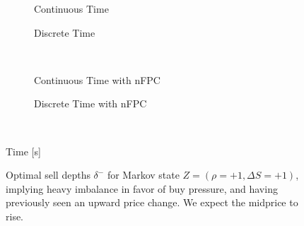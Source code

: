 \begin{figure}%
\centering%
\begin{subfigure}[b]{.4\linewidth}%
  \setlength\figureheight{\linewidth}%
  \setlength\figurewidth{\linewidth}%
  \caption{Continuous Time}%
\end{subfigure}%
\hspace{1.5cm}%
\begin{subfigure}[b]{.4\linewidth}%
  \setlength\figureheight{\linewidth}%
  \setlength\figurewidth{\linewidth}%
  \caption{Discrete Time}%
\end{subfigure}\\%
\vspace{1cm}%
\begin{subfigure}[b]{.4\linewidth}%
  \setlength\figureheight{\linewidth}%
  \setlength\figurewidth{\linewidth}%
  \caption{Continuous Time with nFPC}%
\end{subfigure}%
\hspace{1.5cm}%
\begin{subfigure}[b]{.4\linewidth}%
  \setlength\figureheight{\linewidth}%
  \setlength\figurewidth{\linewidth}%
  \caption{Discrete Time with nFPC}%
\end{subfigure}\\%
%
\leavevmode{}\hspace{0pt plus 1filll}\null%

Time [s]

\vspace{1cm}%
\begin{subfigure}{\linewidth}%
  \centering%
\end{subfigure}%
  \caption[Optimal sell LO depths for buy pressure imbalance]{Optimal sell depths $\delta^{-}$ for Markov state $Z=(\rho = +1, \Delta S = +1)$, implying heavy imbalance in favor of buy pressure, and having previously seen an upward price change. We expect the midprice to rise.}\label{fig:comp_dm_z15}%
\end{figure}
\FloatBarrier
